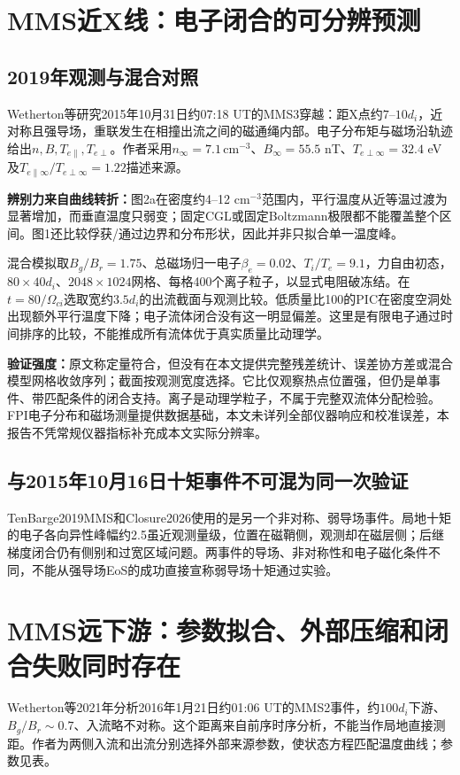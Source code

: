 \section{MMS近X线：电子闭合的可分辨预测}
\subsection{2019年观测与混合对照}
Wetherton等研究2015年10月31日约07:18 UT的MMS3穿越：距X点约$7$--$10d_i$，近对称且强导场，重联发生在相撞出流之间的磁通绳内部。电子分布矩与磁场沿轨迹给出$n,B,T_{e\parallel},T_{e\perp}$。作者采用$n_\infty=7.1\,\mathrm{cm^{-3}}$、$B_\infty=55.5$ nT、$T_{e\perp\infty}=32.4$ eV及$T_{e\parallel\infty}/T_{e\perp\infty}=1.22$描述来源。\citep{Wetherton2019}

\textbf{辨别力来自曲线转折：}图2a在密度约4--12 $\mathrm{cm^{-3}}$范围内，平行温度从近等温过渡为显著增加，而垂直温度只弱变；固定CGL或固定Boltzmann极限都不能覆盖整个区间。图1还比较俘获/通过边界和分布形状，因此并非只拟合单一温度峰。

混合模拟取$B_g/B_r=1.75$、总磁场归一电子$\beta_e=0.02$、$T_i/T_e=9.1$，力自由初态，$80\times40d_i$、$2048\times1024$网格、每格400个离子粒子，以显式电阻破冻结。在$t=80/\Omega_{ci}$选取宽约$3.5d_i$的出流截面与观测比较。低质量比100的PIC在密度空洞处出现额外平行温度下降；电子流体闭合没有这一明显偏差。这里是有限电子通过时间排序的比较，不能推成所有流体优于真实质量比动理学。

\textbf{验证强度：}原文称定量符合，但没有在本文提供完整残差统计、误差协方差或混合模型网格收敛序列；截面按观测宽度选择。它比仅观察热点位置强，但仍是单事件、带匹配条件的闭合支持。离子是动理学粒子，不属于完整双流体分配检验。FPI电子分布和磁场测量提供数据基础，本文未详列全部仪器响应和校准误差，本报告不凭常规仪器指标补充成本文实际分辨率。

\subsection{与2015年10月16日十矩事件不可混为同一次验证}
TenBarge2019MMS和Closure2026使用的是另一个非对称、弱导场事件。局地十矩的电子各向异性峰幅约2.5虽近观测量级，位置在磁鞘侧，观测却在磁层侧；后继梯度闭合仍有侧别和过宽区域问题。两事件的导场、非对称性和电子磁化条件不同，不能从强导场EoS的成功直接宣称弱导场十矩通过实验。\citep{TenBarge2019MMS,Closure2026}

\section{MMS远下游：参数拟合、外部压缩和闭合失败同时存在}
Wetherton等2021年分析2016年1月21日约01:06 UT的MMS2事件，约$100d_i$下游、$B_g/B_r\sim0.7$、入流略不对称。这个距离来自前序时序分析，不能当作局地直接测距。作者为两侧入流和出流分别选择外部来源参数，使状态方程匹配温度曲线；参数见表。\citep{Wetherton2021}

